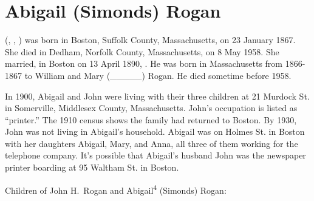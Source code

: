 \section{Abigail (Simonds) Rogan}\label{per:Abigail4Simonds}

 (, , ) was born in Boston, Suffolk County, Massachusetts, on 23 January 1867.\cite{Abigail4SimondsBirth} She died in Dedham, Norfolk County, Massachusetts, on 8 May 1958.\cite{Abigail4SimondsDeath:1} She married, in Boston on 13 April 1890, . He was born in Massachusetts from 1866-1867 to William and Mary (\_\_\_\_\_) Rogan.\cite{Census1880JohnRogan} He died sometime before 1958.\cite{Abigail4SimondsDeath:2}

In 1900, Abigail and John were living with their three children at 21 Murdock St. in Somerville, Middlesex County, Massachusetts. John's occupation is listed as ``printer.''\cite{Census1900AbigailSimonds} The 1910 census shows the family had returned to Boston.\cite{Census1910AbigailSimonds} By 1930, John was not living in Abigail's household. Abigail was on Holmes St. in Boston with her daughters Abigail, Mary, and Anna, all three of them working for the telephone company.\cite{Census1930AbigailSimonds} It's possible that Abigail's husband John was the newspaper printer boarding at 95 Waltham St. in Boston.\cite{Census1930JohnRogan}

\begin{KidsIntro}
	Children of John H.\ Rogan and Abigail\textsuperscript{4} (Simonds) Rogan:
\end{KidsIntro}

